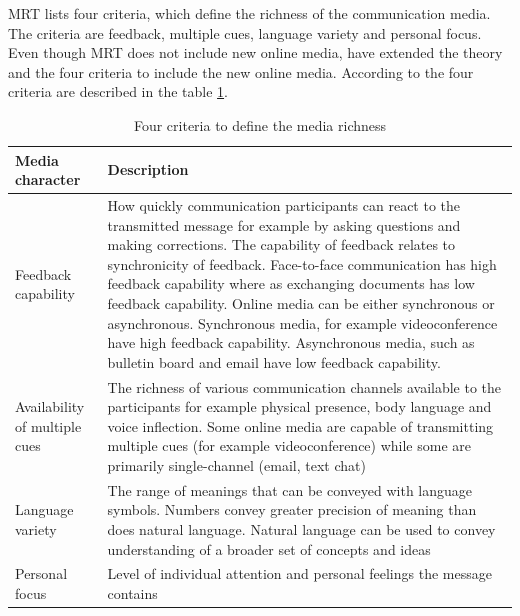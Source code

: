 \documentclass[english,12pt,a4paper,pdftex]{article}
\begin{document}
\Ac{MRT} lists four criteria, which define the richness of the communication media. The criteria are feedback, multiple cues, language variety and personal focus. Even though \ac{MRT} does not include new online media, \citet{graveline2000} have extended the theory and the four criteria to include the new online media. According to \citet{graveline2000} the four criteria are described in the table \ref{table:criteria_media_richness}.


\begin{table}[!h]
\renewcommand{\arraystretch}{1.3}
\caption{Four criteria to define the media richness \citep{graveline2000} \citep{daft1987}}
\label{table:criteria_media_richness}
\centering
\begin{tabular}{|p{4cm}|p{10cm}|}
\hline
\textbf{Media character} & \textbf{Description}\\
\hline
Feedback capability & How quickly communication participants can react to the transmitted message for example by asking questions and making corrections. The capability of feedback relates to synchronicity of feedback. Face-to-face communication has high feedback capability where as exchanging documents has low feedback capability. Online media can be either synchronous or asynchronous. Synchronous media, for example videoconference have high feedback capability. Asynchronous media, such as bulletin board and email have low feedback capability. \\
\hline
Availability of multiple cues & The richness of various communication channels available to the participants for example physical presence, body language and voice inflection. Some online media are capable of transmitting multiple cues (for example videoconference) while some are primarily single-channel (email, text chat) \\
\hline
Language variety & The range of meanings that can be conveyed with language symbols. Numbers convey greater precision of meaning than does natural language. Natural language can be used to convey understanding of a broader set of concepts and ideas \\
\hline
Personal focus & Level of individual attention and personal feelings the message contains \\
\hline
\end{tabular}
\end{table}
\end{document}

